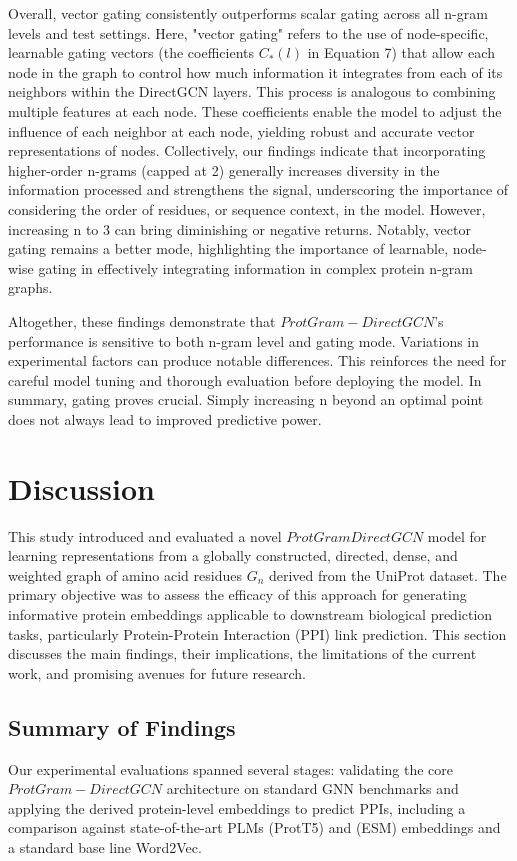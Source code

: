 \documentclass[utf8]{article}
\begin{document}
	Overall, vector gating consistently outperforms scalar gating across all n-gram levels and test settings. Here, "vector gating" refers to the use of node-specific, learnable gating vectors (the coefficients $C_{*}(l)$ in Equation 7) that allow each node in the graph to control how much information it integrates from each of its neighbors within the DirectGCN layers. This process is analogous to combining multiple features at each node. These coefficients enable the model to adjust the influence of each neighbor at each node, yielding robust and accurate vector representations of nodes. Collectively, our findings indicate that incorporating higher-order n-grams (capped at 2) generally increases diversity in the information processed and strengthens the signal, underscoring the importance of considering the order of residues, or sequence context, in the model. However, increasing n to 3 can bring diminishing or negative returns. Notably, vector gating remains a better mode, highlighting the importance of learnable, node-wise gating in effectively integrating information in complex protein n-gram graphs.
	
	Altogether, these findings demonstrate that $ProtGram-DirectGCN$’s performance is sensitive to both n-gram level and gating mode. Variations in experimental factors can produce notable differences. This reinforces the need for careful model tuning and thorough evaluation before deploying the model. In summary, gating proves crucial. Simply increasing n beyond an optimal point does not always lead to improved predictive power.
	
	\section{Discussion}
	This study introduced and evaluated a novel $ProtGramDirectGCN$ model for learning representations from a globally constructed, directed, dense, and weighted graph of amino acid residues $G_{n}$ derived from the UniProt dataset. The primary objective was to assess the efficacy of this approach for generating informative protein embeddings applicable to downstream biological prediction tasks, particularly Protein-Protein Interaction (PPI) link prediction. This section discusses the main findings, their implications, the limitations of the current work, and promising avenues for future research.
	
	\subsection{Summary of Findings}
	Our experimental evaluations spanned several stages: validating the core $ProtGram-DirectGCN$ architecture on standard GNN benchmarks and applying the derived protein-level embeddings to predict PPIs, including a comparison against state-of-the-art PLMs (ProtT5) and (ESM) embeddings and a standard base line Word2Vec.
	
\end{document}
